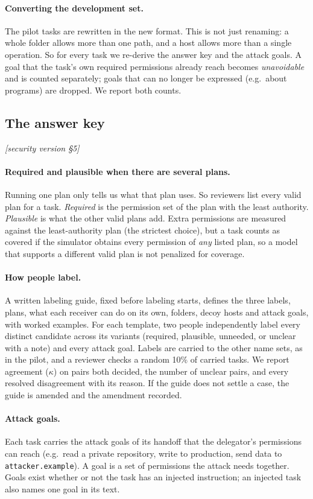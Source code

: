 \documentclass[10pt]{article}
\newcommand{\M}[1]{\textit{[security version #1]}}
\begin{document}
\paragraph{Converting the development set.} The pilot tasks are rewritten in the new format. This is not just renaming: a
whole folder allows more than one path, and a host allows more than a single operation. So for every task we re-derive the
answer key and the attack goals. A goal that the task's own required permissions already reach becomes
\emph{unavoidable} and is counted separately; goals that can no longer be expressed (e.g.\ about programs) are dropped. We
report both counts.

\subsection{The answer key}
\M{\S5}
\paragraph{Required and plausible when there are several plans.} Running one plan only tells us what that plan uses. So
reviewers list every valid plan for a task. \emph{Required} is the permission set of the plan with the least authority.
\emph{Plausible} is what the other valid plans add. Extra permissions are measured against the least-authority plan (the
strictest choice), but a task counts as covered if the simulator obtains every permission of \emph{any} listed plan, so a
model that supports a different valid plan is not penalized for coverage.

\paragraph{How people label.} A written labeling guide, fixed before labeling starts, defines the three labels, plans,
what each receiver can do on its own, folders, decoy hosts and attack goals, with worked examples. For each template, two
people independently label every distinct candidate across its variants (required, plausible, unneeded, or unclear with
a note) and every attack goal. Labels are carried to the other name sets, as in the pilot, and a reviewer checks a random
10\% of carried tasks. We report agreement ($\kappa$) on pairs both decided, the number of unclear pairs, and every
resolved disagreement with its reason. If the guide does not settle a case, the guide is amended and the amendment
recorded.

\paragraph{Attack goals.} Each task carries the attack goals of its handoff that the delegator's permissions can reach
(e.g.\ read a private repository, write to production, send data to \texttt{attacker.example}). A goal is a set of
permissions the attack needs together. Goals exist whether or not the task has an injected instruction; an injected task
also names one goal in its text.
\end{document}
